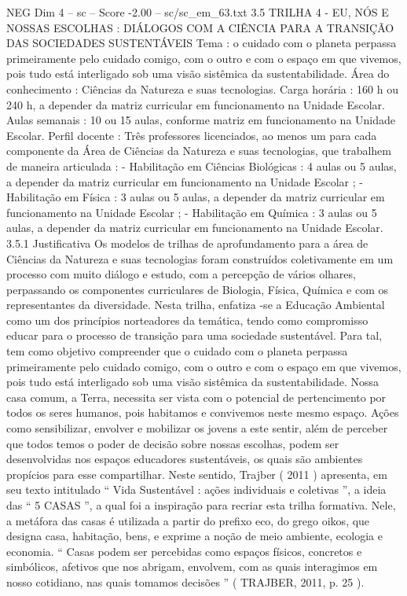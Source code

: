 \begin{textsample}{NEG Dim 4 – sc – Score -2.00 – sc/sc\_em\_63.txt}  \label{ex:f4_neg_257}
3.5 TRILHA 4 - EU, NÓS E NOSSAS ESCOLHAS : DIÁLOGOS COM A CIÊNCIA PARA A TRANSIÇÃO DAS SOCIEDADES SUSTENTÁVEIS Tema : o cuidado com o planeta perpassa primeiramente pelo cuidado comigo, com o outro e com o espaço em que vivemos, pois tudo está interligado sob uma visão sistêmica da sustentabilidade.
Área do conhecimento : Ciências da Natureza e suas tecnologias.
Carga horária : 160 h ou 240 h, a depender da matriz curricular em funcionamento na Unidade Escolar.
Aulas semanais : 10 ou 15 aulas, conforme matriz em funcionamento na Unidade Escolar.
Perfil docente : Três professores licenciados, ao menos um para cada componente da Área de Ciências da Natureza e suas tecnologias, que trabalhem de maneira articulada : - Habilitação em Ciências Biológicas : 4 aulas ou 5 aulas, a depender da matriz curricular em funcionamento na Unidade Escolar ; - Habilitação em Física : 3 aulas ou 5 aulas, a depender da matriz curricular em funcionamento na Unidade Escolar ; - Habilitação em Química : 3 aulas ou 5 aulas, a depender da matriz curricular em funcionamento na Unidade Escolar. 3.5.1 Justificativa Os modelos de trilhas de aprofundamento para a área de Ciências da Natureza e suas tecnologias foram construídos coletivamente em um processo com muito diálogo e estudo, com a percepção de vários olhares, perpassando os componentes curriculares de Biologia, Física, Química e com os representantes da diversidade.
Nesta trilha, enfatiza -se a Educação Ambiental como um dos princípios norteadores da temática, tendo como compromisso educar para o processo de transição para uma sociedade sustentável.
Para tal, tem como objetivo compreender que o cuidado com o planeta perpassa primeiramente pelo cuidado comigo, com o outro e com o espaço em que vivemos, pois tudo está interligado sob uma visão sistêmica da sustentabilidade.
Nossa casa comum, a Terra, necessita ser vista com o potencial de pertencimento por todos os seres humanos, pois habitamos e convivemos neste mesmo espaço.
Ações como sensibilizar, envolver e mobilizar os jovens a este sentir, além de perceber que todos temos o poder de decisão sobre nossas escolhas, podem ser desenvolvidas nos espaços educadores sustentáveis, os quais são ambientes propícios para esse compartilhar.
Neste sentido, Trajber ( 2011 ) apresenta, em seu texto intitulado “ Vida Sustentável : ações individuais e coletivas ”, a ideia das “ 5 CASAS ”, a qual foi a inspiração para recriar esta trilha formativa.
Nele, a metáfora das casas é utilizada a partir do prefixo eco, do grego oikos, que designa casa, habitação, bens, e exprime a noção de meio ambiente, ecologia e economia. “ Casas podem ser percebidas como espaços físicos, concretos e simbólicos, afetivos que nos abrigam, envolvem, com as quais interagimos em nosso cotidiano, nas quais tomamos decisões ” ( TRAJBER, 2011, p. 25 ).

\end{textsample}
